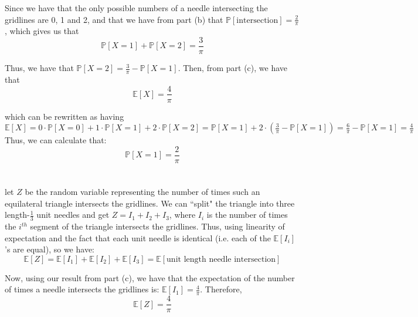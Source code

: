 \documentclass{article}
\begin{document}
Since we have that the only possible numbers of a needle intersecting the gridlines are 0, 1 and 2, and that we have from part (b) that
$\mathbb{P}[\text{intersection}] = \frac{2}{\pi}$, which gives us that
$$\mathbb{P}[X=1] + \mathbb{P}[X=2] = \frac{3}{\pi}$$

Thus, we have that $\mathbb{P}[X=2] = \frac{3}{\pi} - \mathbb{P}[X=1]$. Then, from part (c), we have that
$$\mathbb{E}[X] = \frac{4}{\pi}$$

which can be rewritten as having
$\mathbb{E}[X] =
0\cdot\mathbb{P}[X=0] + 1\cdot\mathbb{P}[X=1] + 2\cdot\mathbb{P}[X=2] =
\mathbb{P}[X=1] + 2\cdot(\frac{3}{\pi} - \mathbb{P}[X=1]) =
\frac{6}{\pi} - \mathbb{P}[X=1] = \frac{4}{\pi}$ \\

Thus, we can calculate that:
$$\mathbb{P}[X=1] = \frac{2}{\pi}$$ \\



 \\

let $Z$ be the random variable representing the number of times such an equilateral triangle intersects the gridlines. We can “split" the triangle into three length-$\frac{1}{3}$ unit needles and get $Z = I_1 + I_2 + I_3$, where $I_i$ is the number of times the $i^{th}$ segment of the triangle intersects the gridlines. Thus, using linearity of expectation and the fact that each unit needle is identical (i.e. each of the $\mathbb{E}[I_i]$'s are equal), so we have:
$$\mathbb{E}[Z] = \mathbb{E}[I_1] + \mathbb{E}[I_2] + \mathbb{E}[I_3] =
\mathbb{E}[\text{unit length needle intersection}]$$

Now, using our result from part (c), we have that the expectation of the number of times a needle intersects the gridlines is:
$\mathbb{E}[I_1] = \frac{4}{\pi}$. Therefore,
$$\mathbb{E}[Z] = \frac{4}{\pi}$$
\end{document}
